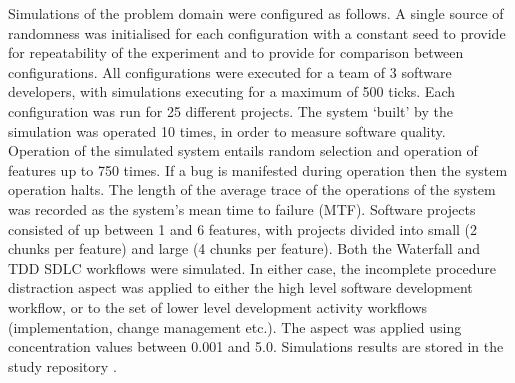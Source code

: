 \documentclass{llncs}
\begin{document}
Simulations of the problem domain were configured as follows.  A single source of randomness was initialised for each
configuration with a constant seed to provide for repeatability of the experiment and to provide for comparison between
configurations. All configurations were executed for a team of 3 software developers, with simulations executing for a
maximum of 500 ticks.  Each configuration was run for 25 different projects.  The system `built' by the simulation was
operated 10 times, in order to measure software quality.  Operation of the simulated system entails random selection and
operation of features up to 750 times.  If a bug is manifested during operation then the system operation halts.  The
length of the average trace of the operations of the system was recorded as the system's mean time to failure
(MTF). Software projects consisted of up between 1 and 6 features, with projects divided into small (2 chunks per
feature) and large (4 chunks per feature). Both the Waterfall and TDD SDLC workflows were simulated.  In either case,
the incomplete procedure distraction aspect was applied to either the high level software development workflow, or to
the set of lower level development activity workflows (implementation, change management etc.).  The aspect was applied
using concentration values between 0.001 and 5.0.  Simulations results are stored in the study repository
\citep{storer2016softdev-workflow-scm}.
\end{document}
